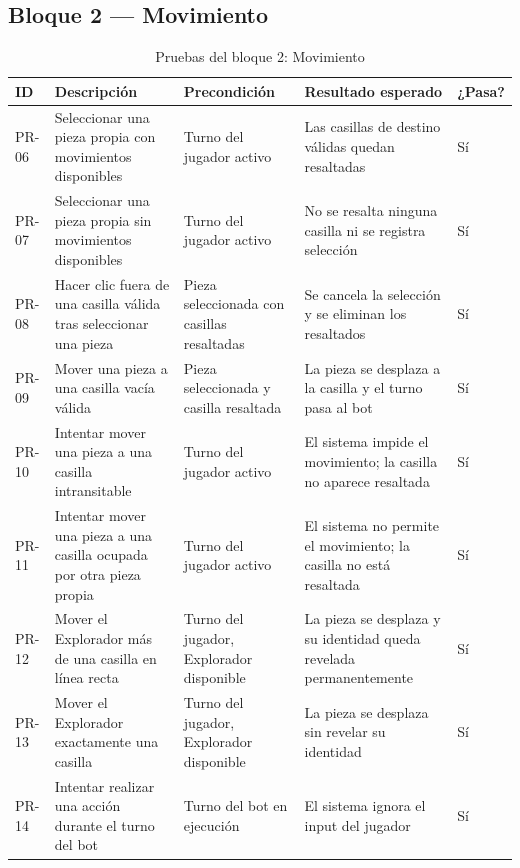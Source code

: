 \clearpage

\subsection{Bloque 2 — Movimiento}

\begin{table}[H]
	\centering
	\small
	\begin{tabular}{|>{\centering\arraybackslash}p{1cm}|>{\centering\arraybackslash}p{4cm}|>{\centering\arraybackslash}p{4cm}|>{\centering\arraybackslash}p{4cm}|>{\centering\arraybackslash}p{1.5cm}|}
		\hline
		\textbf{ID} & \textbf{Descripción} & \textbf{Precondición} & \textbf{Resultado esperado} & \textbf{¿Pasa?} \\
		\hline
		PR-06 & Seleccionar una pieza propia con movimientos disponibles & Turno del jugador activo & Las casillas de destino válidas quedan resaltadas & \cellcolor{green!40}Sí \\
		\hline
		PR-07 & Seleccionar una pieza propia sin movimientos disponibles & Turno del jugador activo & No se resalta ninguna casilla ni se registra selección & \cellcolor{green!40}Sí \\
		\hline
		PR-08 & Hacer clic fuera de una casilla válida tras seleccionar una pieza & Pieza seleccionada con casillas resaltadas & Se cancela la selección y se eliminan los resaltados & \cellcolor{green!40}Sí \\
		\hline
		PR-09 & Mover una pieza a una casilla vacía válida & Pieza seleccionada y casilla resaltada & La pieza se desplaza a la casilla y el turno pasa al bot & \cellcolor{green!40}Sí \\
		\hline
		PR-10 & Intentar mover una pieza a una casilla intransitable & Turno del jugador activo & El sistema impide el movimiento; la casilla no aparece resaltada & \cellcolor{green!40}Sí \\
		\hline
		PR-11 & Intentar mover una pieza a una casilla ocupada por otra pieza propia & Turno del jugador activo & El sistema no permite el movimiento; la casilla no está resaltada & \cellcolor{green!40}Sí \\
		\hline
		PR-12 & Mover el Explorador más de una casilla en línea recta & Turno del jugador, Explorador disponible & La pieza se desplaza y su identidad queda revelada permanentemente & \cellcolor{green!40}Sí \\
		\hline
		PR-13 & Mover el Explorador exactamente una casilla & Turno del jugador, Explorador disponible & La pieza se desplaza sin revelar su identidad & \cellcolor{green!40}Sí \\
		\hline
		PR-14 & Intentar realizar una acción durante el turno del bot & Turno del bot en ejecución & El sistema ignora el input del jugador & \cellcolor{green!40}Sí \\
		\hline
	\end{tabular}
	\caption{Pruebas del bloque 2: Movimiento}
\end{table}


